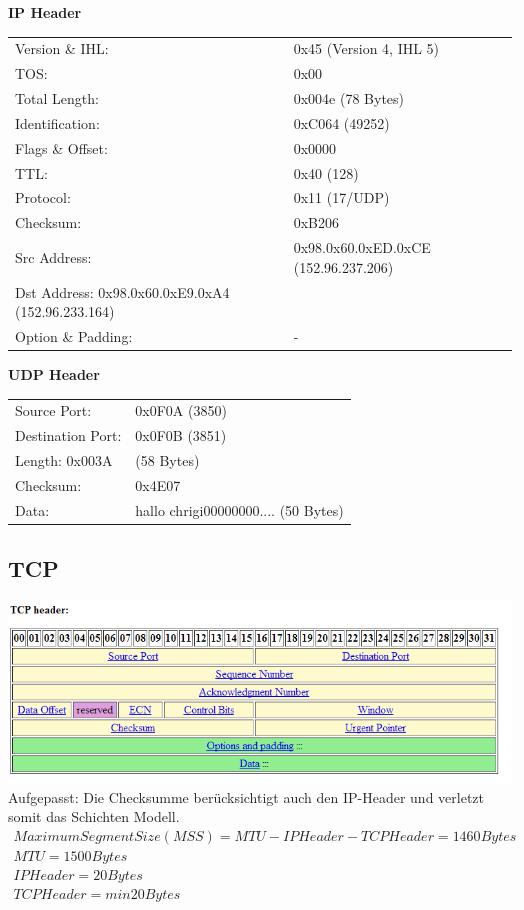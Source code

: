 \textbf{IP Header}\\
\begin{tabular}[h]{ll}
Version \& IHL: & 0x45 (Version 4, IHL 5)\\
TOS: & 0x00\\
Total Length: & 0x004e (78 Bytes)\\
Identification: & 0xC064 (49252)\\
Flags \& Offset: & 0x0000\\
TTL: & 0x40 (128)\\
Protocol: & 0x11 (17/UDP)\\
Checksum: & 0xB206 \\
Src Address: & 0x98.0x60.0xED.0xCE (152.96.237.206)\\
Dst Address: 0x98.0x60.0xE9.0xA4 (152.96.233.164)\\
Option \& Padding: & -\\
\end{tabular}

\textbf{UDP Header}\\
\begin{tabular}[h]{ll}
Source Port: & 0x0F0A (3850)\\
Destination Port: & 0x0F0B (3851)\\
Length: 0x003A & (58 Bytes)\\
Checksum: & 0x4E07\\
Data: & hallo chrigi00000000.... (50 Bytes)
\end{tabular}


\subsection{TCP}

\includegraphics[scale=0.8]{media/TCPHeader.png}
Aufgepasst: Die Checksumme berücksichtigt auch den IP-Header und verletzt somit das Schichten Modell. \\
\begin{align*}
Maximum Segment Size (MSS) = MTU - IPHeader - TCP Header = 1460 Bytes\\
MTU = 1500Bytes\\
IPHeader = 20 Bytes\\
TCPHeader = min 20Bytes
\end{align*}

